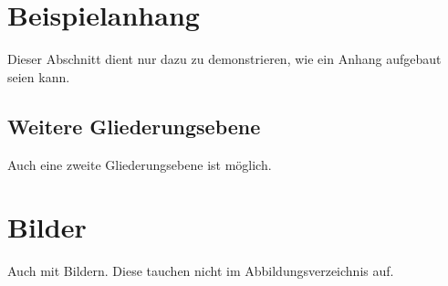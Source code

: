 \section{Beispielanhang}\label{Beispielanhang}
Dieser Abschnitt dient nur dazu zu demonstrieren, wie ein Anhang aufgebaut seien kann.
\subsection{Weitere Gliederungsebene}
Auch eine zweite Gliederungsebene ist möglich.
\section{Bilder}
Auch mit Bildern.
Diese tauchen nicht im Abbildungsverzeichnis auf.